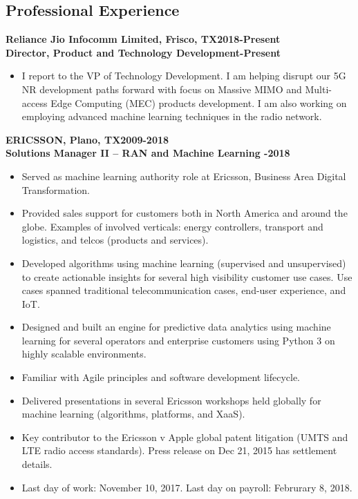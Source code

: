 \documentclass{article}
\begin{document}
\subsection*{\sc \centering Professional Experience}
\textbf{Reliance Jio Infocomm Limited, Frisco, TX\hfill 2018-Present}\\
\textbf{Director, Product and Technology Development\hfill {}-Present}
\begin{itemize}
\item I report to the VP of Technology Development. I am helping disrupt our 5G NR development paths forward with focus on Massive MIMO and Multi-access Edge Computing (MEC) products development. I am also working on employing advanced machine learning techniques in the radio network.
\end{itemize}
\textbf{ERICSSON, Plano, TX\hfill 2009-2018}\\
\textbf{Solutions Manager II -- RAN and Machine Learning \hfill{}-2018}
\begin{itemize}
\item Served as machine learning authority role at Ericsson, Business Area Digital Transformation. 
\item Provided sales support for customers both in North America and around the globe. Examples of involved verticals: energy controllers, transport and logistics, and telcos (products and services).
\item Developed algorithms using machine learning (supervised and unsupervised) to create actionable insights for several high visibility customer use cases. Use cases spanned traditional telecommunication cases, end-user experience, and IoT. 
\item Designed and built an engine for predictive data analytics using machine learning for several operators and enterprise customers using Python 3 on highly scalable environments.%
\item Familiar with Agile principles and software development lifecycle.
\item Delivered presentations in several Ericsson workshops held globally for machine learning (algorithms, platforms, and XaaS). 
\item Key contributor to the Ericsson v Apple global patent litigation (UMTS and LTE radio access standards). Press release on Dec 21, 2015 has settlement details.
\item Last day of work: November 10, 2017.  Last day on payroll: Februrary 8, 2018.
\end{itemize}
\end{document}
